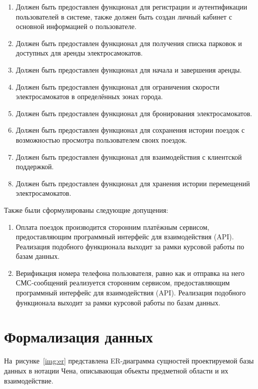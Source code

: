 \begin{enumerate}
    \item Должен быть предоставлен функционал для регистрации и аутентификации пользователей в системе, также должен быть создан личный кабинет с основной информацией о пользователе.
    \item Должен быть предоставлен функционал для получения списка парковок и доступных для аренды электросамокатов.
    \item Должен быть предоставлен функционал для начала и завершения аренды.
    \item Должен быть предоставлен функционал для ограничения скорости электросамокатов в определённых зонах города.
    \item Должен быть предоставлен функционал для бронирования электросамокатов.
    \item Должен быть предоставлен функционал для сохранения истории поездок с возможностью просмотра пользователем своих поездок.
    \item Должен быть предоставлен функционал для взаимодействия с клиентской поддержкой.
    \item Должен быть предоставлен функционал для хранения истории перемещений электросамокатов.
\end{enumerate}

Также были сформулированы следующие допущения:

\begin{enumerate}
    \item Оплата поездок производится сторонним платёжным сервисом, предоставляющим программный интерфейс для взаимодействия (API). Реализация подобного функционала выходит за рамки курсовой работы по базам данных.
    \item Верификация номера телефона пользователя, равно как и отправка на него СМС-сообщений реализуется сторонним сервисом, предоставляющим программный интерфейс для взаимодействия (API). Реализация подобного функционала выходит за рамки курсовой работы по базам данных.
\end{enumerate}

\section{Формализация данных}

На~рисунке~\ref{img:er} представлена ER-диаграмма сущностей проектируемой базы данных в нотации Чена, описывающая объекты предметной области и их взаимодействие.

